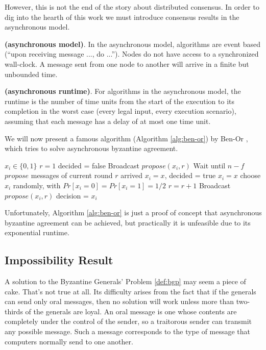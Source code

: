 \bigskip
\noindent
However, this is not the end of the story about distributed consensus. In order to dig into the hearth of this work we must introduce consensus results in the asynchronous model.
\begin{mydef}{\bf (asynchronous model)}.
    In the asynchronous model, algorithms are event based (\enquote{upon receiving message ..., do ...}). Nodes do not have access to a synchronized wall-clock. A message sent from one node to another will arrive in a finite but unbounded time.
\end{mydef}
\begin{mydef}{\bf (asynchronous runtime)}.
    For algorithms in the asynchronous model, the runtime is the number of time units from the start of the execution to its completion in the worst case (every legal input, every execution scenario), assuming that each message has a delay of at most one time unit.    
\end{mydef}

\bigskip
\noindent
We will now present a famous algorithm (Algorithm \ref{alg:ben-or}) by Ben-Or \cite{Ben-Or:1983:AFC:800221.806707}, which tries to solve asynchronous byzantine agreement.

\bigskip
\begin{algorithm}
	\caption{Asynchronous Byzantine Agreement (Ben-Or, for $f < n/9$)}
	\label{alg:ben-or}
	\begin{algorithmic}[1]
		\State $x_{i} \in \{0,1\}$ 
		\State $r=1$ 
		\State decided = false
		\State Broadcast $propose(x_{i},r)$
		\Repeat
		\State Wait until $n-f$ $propose$ messages of current round $r$ arrived
		\State $x_{i}=x$, decided = true
		\State $x_{i}=x$
		\Else
		\State choose $x_{i}$ randomly, with $Pr[x_{i}=0] = Pr[x_{i}=1] = 1/2$
		\EndIf
		\State $r=r+1$
		\State Broadcast $propose(x_{i},r)$
		\State decision = $x_{i}$
	\end{algorithmic}
\end{algorithm}

\bigskip
\noindent
Unfortunately, Algorithm \ref{alg:ben-or} is just a proof of concept that asynchronous byzantine agreement can be achieved, but practically it is unfeasible due to its exponential runtime.

\bigskip
\subsection{Impossibility Result}
A solution to the Byzantine Generals' Problem \ref{def:bgp} may seem a piece of cake. That's not true at all. Its difficulty arises from the fact that if the generals can send only oral messages, then no solution will work unless more than two-thirds of the generals are loyal. An oral message is one whose contents are completely under the control of the sender, so a traitorous sender can transmit any possible message.
Such a message corresponds to the type of message that computers normally send to one another.

